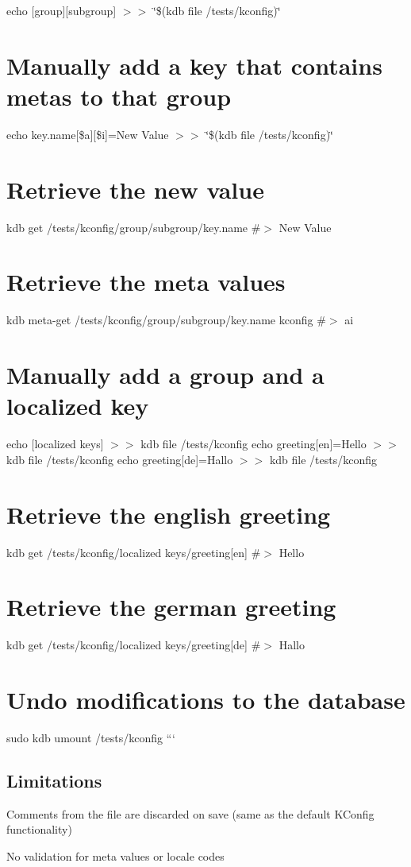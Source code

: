 echo \textquotesingle{}\mbox{[}group\mbox{]}\mbox{[}subgroup\mbox{]}\textquotesingle{} $>$$>$ \char`\"{}\$(kdb file /tests/kconfig)\char`\"{}\hypertarget{autotoc_md322_autotoc_md330}{}\section{Manually add a key that contains metas to that group}\label{autotoc_md322_autotoc_md330}
echo \textquotesingle{}key.\+name\mbox{[}\$a\mbox{]}\mbox{[}\$i\mbox{]}=New Value\textquotesingle{} $>$$>$ \char`\"{}\$(kdb file /tests/kconfig)\char`\"{}\hypertarget{autotoc_md322_autotoc_md331}{}\section{Retrieve the new value}\label{autotoc_md322_autotoc_md331}
kdb get /tests/kconfig/group/subgroup/key.name \#$>$ New Value\hypertarget{autotoc_md322_autotoc_md332}{}\section{Retrieve the meta values}\label{autotoc_md322_autotoc_md332}
kdb meta-\/get /tests/kconfig/group/subgroup/key.name kconfig \#$>$ ai\hypertarget{autotoc_md322_autotoc_md333}{}\section{Manually add a group and a localized key}\label{autotoc_md322_autotoc_md333}
echo \textquotesingle{}\mbox{[}localized keys\mbox{]}\textquotesingle{} $>$$>$ {\ttfamily kdb file /tests/kconfig} echo \textquotesingle{}greeting\mbox{[}en\mbox{]}=Hello\textquotesingle{} $>$$>$ {\ttfamily kdb file /tests/kconfig} echo \textquotesingle{}greeting\mbox{[}de\mbox{]}=Hallo\textquotesingle{} $>$$>$ {\ttfamily kdb file /tests/kconfig}\hypertarget{autotoc_md322_autotoc_md334}{}\section{Retrieve the english greeting}\label{autotoc_md322_autotoc_md334}
kdb get \textquotesingle{}/tests/kconfig/localized keys/greeting\mbox{[}en\mbox{]}\textquotesingle{} \#$>$ Hello\hypertarget{autotoc_md322_autotoc_md335}{}\section{Retrieve the german greeting}\label{autotoc_md322_autotoc_md335}
kdb get \textquotesingle{}/tests/kconfig/localized keys/greeting\mbox{[}de\mbox{]}\textquotesingle{} \#$>$ Hallo\hypertarget{autotoc_md322_autotoc_md336}{}\section{Undo modifications to the database}\label{autotoc_md322_autotoc_md336}
sudo kdb umount /tests/kconfig ```\hypertarget{autotoc_md322_autotoc_md337}{}\subsection{Limitations}\label{autotoc_md322_autotoc_md337}

\begin{DoxyItemize}
\item Comments from the file are discarded on save (same as the default K\+Config functionality)
\item No validation for meta values or locale codes 
\end{DoxyItemize}